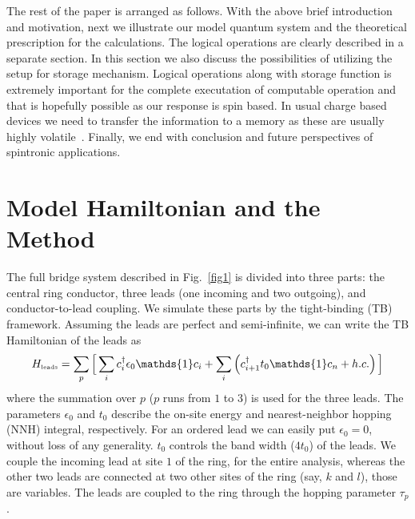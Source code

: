 \documentclass[doublecol]{epl2}
\begin{document}
The rest of the paper is arranged as follows. With the above brief 
introduction and motivation, next we illustrate our model quantum system and 
the theoretical prescription for the calculations. The logical operations 
are clearly described in a separate section. In this section we also 
discuss the possibilities of utilizing the setup for storage mechanism.
Logical operations along with storage function is extremely important for the
complete executation of computable operation and that is hopefully possible as
our response is spin based. In usual charge based devices we need to transfer
the information to a memory as these are usually highly volatile~\cite{repro}.
Finally, we end with conclusion and future perspectives of spintronic 
applications.

\section{Model Hamiltonian and the Method}

The full bridge system described in Fig.~\ref{fig1} is divided into three parts:
the central ring conductor, three leads (one incoming and two outgoing), and 
conductor-to-lead coupling. We simulate these parts by the tight-binding (TB) 
framework. Assuming the leads are perfect and semi-infinite, we can write the
TB Hamiltonian of the leads as
\begin{equation}
H_{\mbox{\tiny leads}} = \sum\limits_p \Big[ \sum\limits_i
c_i^\dagger \epsilon_0 \mathds{1} c_i + \sum\limits_i \left(
c_{i+1}^\dagger t_0 \mathds{1} c_n +  h.c.\right)\Big]
\label{eq1}
\end{equation}
where the summation over $p$ ($p$ runs from $1$ to $3$) is used for the three 
leads. The parameters $\epsilon_0$ and $t_0$ describe the on-site energy and 
nearest-neighbor hopping (NNH) integral, respectively. For an ordered lead we 
can easily put $\epsilon_0=0$, without loss of any generality. $t_0$ controls 
the band width ($4t_0$) of the leads. We couple the incoming lead at site $1$ 
of the ring, for the entire analysis, whereas the other two leads are connected
at two other sites of the ring (say, $k$ and $l$), those are variables. 
The leads are coupled to the ring through the hopping parameter $\tau_p$.
\end{document}
